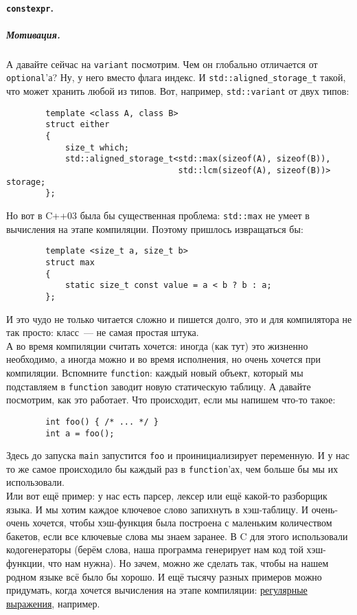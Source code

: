 \documentclass{article}
\begin{document}
    \paragraph{\texttt{constexpr}.}
    \subparagraph{Мотивация.}
    А давайте сейчас на \texttt{variant} посмотрим. Чем он глобально отличается от \texttt{optional}'а? Ну, у него вместо флага индекс. И \texttt{std::aligned_storage_t} такой, что может хранить любой из типов. Вот, например, \texttt{std::variant} от двух типов:
    \begin{verbatim}
        template <class A, class B>
        struct either
        {
            size_t which;
            std::aligned_storage_t<std::max(sizeof(A), sizeof(B)),
                                   std::lcm(sizeof(A), sizeof(B))> storage;
        };
    \end{verbatim}
    Но вот в C++03 была бы существенная проблема: \texttt{std::max} не умеет в вычисления на этапе компиляции. Поэтому пришлось извращаться бы:
    \begin{verbatim}
        template <size_t a, size_t b>
        struct max
        {
            static size_t const value = a < b ? b : a;
        };
    \end{verbatim}
    И это чудо не только читается сложно и пишется долго, это и для компилятора не так просто: класс~--- не самая простая штука.\\
    А во время компиляции считать хочется: иногда (как тут) это жизненно необходимо, а иногда можно и во время исполнения, но очень хочется при компиляции. Вспомните \texttt{function}: каждый новый объект, который мы подставляем в \texttt{function} заводит новую статическую таблицу. А давайте посмотрим, как это работает. Что происходит, если мы напишем что-то такое:
    \begin{verbatim}
        int foo() { /* ... */ }
        int a = foo();
    \end{verbatim}
    Здесь до запуска \texttt{main} запустится \texttt{foo} и проинициализирует переменную. И у нас то же самое происходило бы каждый раз в \texttt{function}'ах, чем больше бы мы их использовали.\\
    Или вот ещё пример: у нас есть парсер, лексер или ещё какой-то разборщик языка. И мы хотим каждое ключевое слово запихнуть в хэш-таблицу. И очень-очень хочется, чтобы хэш-функция была построена с маленьким количеством бакетов, если все ключевые слова мы знаем заранее. В C для этого использовали кодогенераторы (берём слова, наша программа генерирует нам код той хэш-функции, что нам нужна). Но зачем, можно же сделать так, чтобы на нашем родном языке всё было бы хорошо. И ещё тысячу разных примеров можно придумать, когда хочется вычисления на этапе компиляции: \href{https://github.com/hanickadot/compile-time-regular-expressions}{регулярные выражения}, например.
\end{document}
